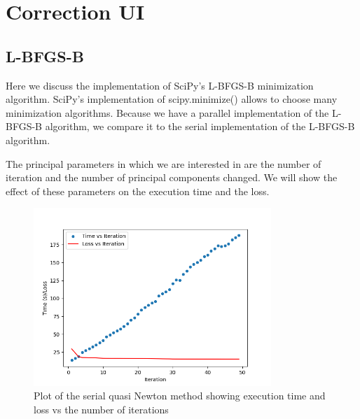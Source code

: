 \section{Correction UI}

\subsection{L-BFGS-B}

Here we discuss the implementation of SciPy's L-BFGS-B minimization algorithm. SciPy's implementation of scipy.minimize() allows to choose many minimization algorithms. Because we have a parallel implementation of the 
L-BFGS-B algorithm, we compare it to the serial implementation of the L-BFGS-B algorithm. 

The principal parameters in which we are interested in are the number of iteration and the number of principal components changed. We will show the effect of these parameters on the execution time and the loss.

\begin{figure}
    \centering
    \includegraphics[width = 0.8\textwidth]{figures/plot_quasiNewton_serial.png}
    \caption[Serial quasi Newton: time and loss vs iterations]{Plot of the serial quasi Newton method showing execution time and loss vs the number of iterations}
    \label{fig:plot_quasiNewton_ser_time}
\end{figure}

